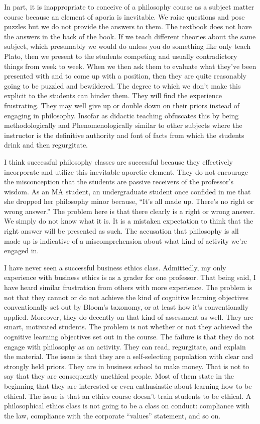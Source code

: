 \documentclass[letterpaper,notitlepage,12pt]{article}
\begin{document}
In part, it is inappropriate to conceive of a philosophy course as a subject
matter course because an element of aporia is inevitable.
We raise questions and pose puzzles but we do not provide the answers to them.
The textbook does not have the answers in the back of the book.
If we teach different theories about the same subject, which presumably we would
do unless you do something like only teach Plato, then we present to the
students competing and usually contradictory things from week to week.
When we then ask them to evaluate what they've been presented with and to come
up with a position, then they are quite reasonably going to be puzzled and
bewildered.
The degree to which we don't make this explicit to the students can hinder them.
They will find the experience frustrating.
They may well give up or double down on their priors instead of engaging in
philosophy.
Insofar as didactic teaching obfuscates this by being methodologically and
Phenomenologically similar to other subjects where the instructor is the
definitive authority and font of facts from which the students drink and then
regurgitate.

I think successful philosophy classes are successful because they effectively
incorporate and utilize this inevitable aporetic element.
They do not encourage the misconception that the students are passive receivers
of the professor's wisdom.
As an MA student, an undergraduate student once confided in me that she dropped
her philosophy minor because, ``It's all made up. There's no right or wrong
answer.''
The problem here is that there clearly is a right or wrong answer.
We simply do not know what it is.
It is a mistaken expectation to think that the right answer will be presented as
such.
The accusation that philosophy is all made up is indicative of a
miscomprehension about what kind of activity we're engaged in.

I have never seen a successful business ethics class.
Admittedly, my only experience with business ethics is as a grader for one
professor.
That being said, I have heard similar frustration from others with more
experience.
The problem is not that they cannot or do not achieve the kind of cognitive
learning objectives conventionally set out by Bloom's taxonomy, or at least how
it's conventionally applied.
Moreover, they do decently on that kind of assessment as well.
They are smart, motivated students.
The problem is not whether or not they achieved the cognitive learning
objectives set out in the course.
The failure is that they do not engage with philosophy as an activity.
They can read, regurgitate, and explain the material.
The issue is that they are a self-selecting population with clear and strongly
held priors.
They are in business school to make money.
That is not to say that they are consequently unethical people.
Most of them state in the beginning that they are interested or even
enthusiastic about learning how to be ethical.
The issue is that an ethics course doesn't train students to be ethical. A
philosophical ethics class is not going to be a class on conduct: compliance
with the law, compliance with the corporate ``values'' statement, and so on.
\end{document}

